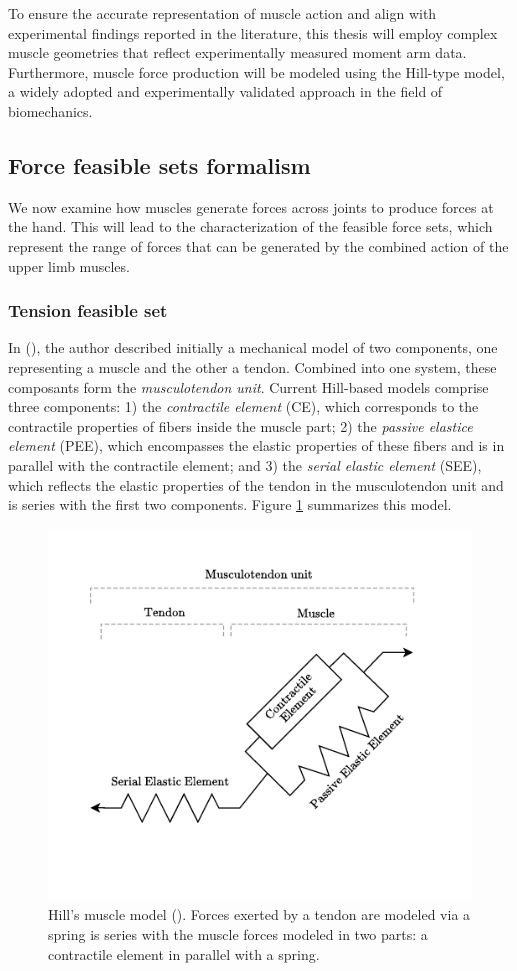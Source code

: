 To ensure the accurate representation of muscle action and align with experimental findings reported in the literature, this thesis will employ complex muscle geometries that reflect experimentally measured moment arm data. Furthermore, muscle force production will be modeled using the Hill-type model, a widely adopted and experimentally validated approach in the field of biomechanics.

\subsection{Force feasible sets formalism}
We now examine how muscles generate forces across joints to produce forces at the hand. This will lead to the characterization of the feasible force sets, which represent the range of forces that can be generated by the combined action of the upper limb muscles.

\subsubsection*{Tension feasible set}
In (\cite{hillHeatShorteningDynamic1938}), the author described initially a mechanical model of two components, one representing a muscle and the other a tendon. Combined into one system, these composants form the \emph{musculotendon unit}. Current Hill-based models comprise three components: 1) the \emph{contractile element} (CE), which corresponds to the contractile properties of fibers inside the muscle part; 2) the \emph{passive elastice element} (PEE), which encompasses the elastic properties of these fibers and is in parallel with the contractile element; and 3) the \emph{serial elastic element} (SEE), which reflects the elastic properties
of the tendon in the musculotendon unit and is series with the first two components. Figure \ref{fig:hill_mech_model} summarizes this model.
\begin{figure}[!htb]
    \captionsetup{justification=centering}
    \centering
    \includegraphics[trim={20 30 30 15}, clip, width=0.5\linewidth]{img/chapter_1/hill_mechanical_model.pdf}
    \caption{Hill's muscle model (\cite{hillHeatShorteningDynamic1938}). Forces exerted by a tendon are modeled via a spring is series with the muscle forces modeled in two parts: a contractile element in parallel with a spring.}
    \label{fig:hill_mech_model}
\end{figure}

